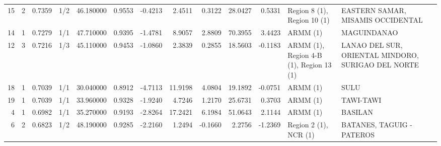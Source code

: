 \begin{tabular}{rrrlrrrrrrrll}
15 & 2 & {\cellcolor[HTML]{BAD0F8}} \color[HTML]{000000} 0.7359 & 1/2 & {\cellcolor[HTML]{F18F71}} \color[HTML]{F1F1F1} 46.180000 & 0.9553 & -0.4213 & 2.4511 & 0.3122 & 28.0427 & 0.5331 & Region 8 (1), Region 10 (1) & EASTERN SAMAR, MISAMIS OCCIDENTAL \\
14 & 1 & {\cellcolor[HTML]{A6C4FE}} \color[HTML]{000000} 0.7279 & 1/1 & {\cellcolor[HTML]{E36C55}} \color[HTML]{F1F1F1} 47.710000 & 0.9395 & -1.4781 & 8.9057 & 2.8809 & 70.3955 & 3.4423 & ARMM (1) & MAGUINDANAO \\
12 & 3 & {\cellcolor[HTML]{97B8FF}} \color[HTML]{000000} 0.7216 & 1/3 & {\cellcolor[HTML]{F6A385}} \color[HTML]{000000} 45.110000 & 0.9453 & -1.0860 & 2.3839 & 0.2855 & 18.5603 & -0.1183 & ARMM (1), Region 4-B (1), Region 13 (1) & LANAO DEL SUR, ORIENTAL MINDORO, SURIGAO DEL NORTE \\
18 & 1 & {\cellcolor[HTML]{6B8DF0}} \color[HTML]{F1F1F1} 0.7039 & 1/1 & {\cellcolor[HTML]{3B4CC0}} \color[HTML]{F1F1F1} 30.040000 & 0.8912 & -4.7113 & 11.9198 & 4.0804 & 19.1892 & -0.0751 & ARMM (1) & SULU \\
19 & 1 & {\cellcolor[HTML]{6B8DF0}} \color[HTML]{F1F1F1} 0.7039 & 1/1 & {\cellcolor[HTML]{779AF7}} \color[HTML]{F1F1F1} 33.960000 & 0.9328 & -1.9240 & 4.7246 & 1.2170 & 25.6731 & 0.3703 & ARMM (1) & TAWI-TAWI \\
4 & 1 & {\cellcolor[HTML]{5D7CE6}} \color[HTML]{F1F1F1} 0.6982 & 1/1 & {\cellcolor[HTML]{8DB0FE}} \color[HTML]{000000} 35.270000 & 0.9193 & -2.8264 & 17.2421 & 6.1984 & 51.0643 & 2.1144 & ARMM (1) & BASILAN \\
6 & 2 & {\cellcolor[HTML]{3B4CC0}} \color[HTML]{F1F1F1} 0.6823 & 1/2 & {\cellcolor[HTML]{DE614D}} \color[HTML]{F1F1F1} 48.190000 & 0.9285 & -2.2160 & 1.2494 & -0.1660 & 2.2756 & -1.2369 & Region 2 (1), NCR (1) & BATANES, TAGUIG - PATEROS \\
\bottomrule
\end{tabular}
